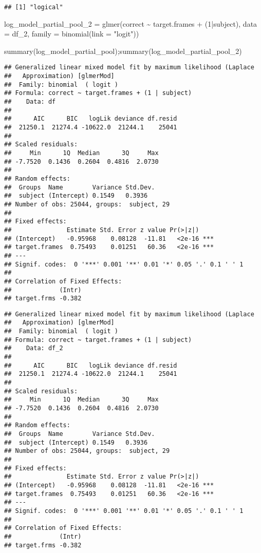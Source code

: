 \documentclass[
]{article}
\newenvironment{Shaded}{\begin{snugshade}}{\end{snugshade}}
\newcommand{\AttributeTok}[1]{\textcolor[rgb]{0.77,0.63,0.00}{#1}}
\newcommand{\DecValTok}[1]{\textcolor[rgb]{0.00,0.00,0.81}{#1}}
\newcommand{\FunctionTok}[1]{\textcolor[rgb]{0.00,0.00,0.00}{#1}}
\newcommand{\NormalTok}[1]{#1}
\newcommand{\OtherTok}[1]{\textcolor[rgb]{0.56,0.35,0.01}{#1}}
\newcommand{\SpecialCharTok}[1]{\textcolor[rgb]{0.00,0.00,0.00}{#1}}
\newcommand{\StringTok}[1]{\textcolor[rgb]{0.31,0.60,0.02}{#1}}
\begin{document}
\begin{verbatim}
## [1] "logical"
\end{verbatim}

\begin{Shaded}
\begin{Highlighting}[]
\NormalTok{log\_model\_partial\_pool\_2 }\OtherTok{=} \FunctionTok{glmer}\NormalTok{(correct }\SpecialCharTok{\textasciitilde{}}\NormalTok{ target.frames }\SpecialCharTok{+}\NormalTok{ (}\DecValTok{1}\SpecialCharTok{|}\NormalTok{subject), }\AttributeTok{data =}\NormalTok{ df\_2, }\AttributeTok{family =} \FunctionTok{binomial}\NormalTok{(}\AttributeTok{link =} \StringTok{"logit"}\NormalTok{))}



\FunctionTok{summary}\NormalTok{(log\_model\_partial\_pool);}\FunctionTok{summary}\NormalTok{(log\_model\_partial\_pool\_2)}
\end{Highlighting}
\end{Shaded}

\begin{verbatim}
## Generalized linear mixed model fit by maximum likelihood (Laplace
##   Approximation) [glmerMod]
##  Family: binomial  ( logit )
## Formula: correct ~ target.frames + (1 | subject)
##    Data: df
## 
##      AIC      BIC   logLik deviance df.resid 
##  21250.1  21274.4 -10622.0  21244.1    25041 
## 
## Scaled residuals: 
##     Min      1Q  Median      3Q     Max 
## -7.7520  0.1436  0.2604  0.4816  2.0730 
## 
## Random effects:
##  Groups  Name        Variance Std.Dev.
##  subject (Intercept) 0.1549   0.3936  
## Number of obs: 25044, groups:  subject, 29
## 
## Fixed effects:
##               Estimate Std. Error z value Pr(>|z|)    
## (Intercept)   -0.95968    0.08128  -11.81   <2e-16 ***
## target.frames  0.75493    0.01251   60.36   <2e-16 ***
## ---
## Signif. codes:  0 '***' 0.001 '**' 0.01 '*' 0.05 '.' 0.1 ' ' 1
## 
## Correlation of Fixed Effects:
##             (Intr)
## target.frms -0.382
\end{verbatim}

\begin{verbatim}
## Generalized linear mixed model fit by maximum likelihood (Laplace
##   Approximation) [glmerMod]
##  Family: binomial  ( logit )
## Formula: correct ~ target.frames + (1 | subject)
##    Data: df_2
## 
##      AIC      BIC   logLik deviance df.resid 
##  21250.1  21274.4 -10622.0  21244.1    25041 
## 
## Scaled residuals: 
##     Min      1Q  Median      3Q     Max 
## -7.7520  0.1436  0.2604  0.4816  2.0730 
## 
## Random effects:
##  Groups  Name        Variance Std.Dev.
##  subject (Intercept) 0.1549   0.3936  
## Number of obs: 25044, groups:  subject, 29
## 
## Fixed effects:
##               Estimate Std. Error z value Pr(>|z|)    
## (Intercept)   -0.95968    0.08128  -11.81   <2e-16 ***
## target.frames  0.75493    0.01251   60.36   <2e-16 ***
## ---
## Signif. codes:  0 '***' 0.001 '**' 0.01 '*' 0.05 '.' 0.1 ' ' 1
## 
## Correlation of Fixed Effects:
##             (Intr)
## target.frms -0.382
\end{verbatim}
\end{document}
